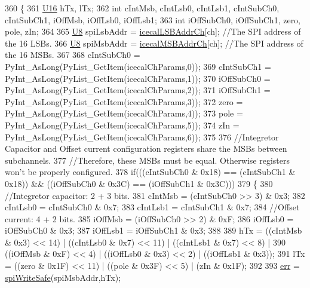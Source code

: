 \begin{DoxyCode}
360 \{                            
361     \hyperlink{ICECALv3_8h_adf928e51a60dba0df29d615401cc55a8}{U16} hTx, lTx;
362     \textcolor{keywordtype}{int} cIntMsb, cIntLsb0, cIntLsb1, cIntSubCh0, cIntSubCh1, iOffMsb, iOffLsb0, iOffLsb1;
363     \textcolor{keywordtype}{int} iOffSubCh0, iOffSubCh1, zero, pole, zIn;
364 
365     \hyperlink{ICECALv3_8h_a3cb25ca6f51f003950f9625ff05536fc}{U8} spiLsbAddr = \hyperlink{ICECALv3_8h_abd124f50fa794b9b0aded801fabf5322}{icecalLSBAddrCh}[ch];           \textcolor{comment}{//The SPI address of the 16 LSBs.}
366     \hyperlink{ICECALv3_8h_a3cb25ca6f51f003950f9625ff05536fc}{U8} spiMsbAddr = \hyperlink{ICECALv3_8h_afba64a649cc9314882fd49b62b99d6e7}{icecalMSBAddrCh}[ch];           \textcolor{comment}{//The SPI address of the 16 MSBs.}
367 
368     cIntSubCh0 = PyInt\_AsLong(PyList\_GetItem(icecalChParams,0));
369     cIntSubCh1 = PyInt\_AsLong(PyList\_GetItem(icecalChParams,1));
370     iOffSubCh0 = PyInt\_AsLong(PyList\_GetItem(icecalChParams,2));
371     iOffSubCh1 = PyInt\_AsLong(PyList\_GetItem(icecalChParams,3));
372     zero             = PyInt\_AsLong(PyList\_GetItem(icecalChParams,4));
373     pole             = PyInt\_AsLong(PyList\_GetItem(icecalChParams,5));
374     zIn              = PyInt\_AsLong(PyList\_GetItem(icecalChParams,6));
375 
376     \textcolor{comment}{//Integretor Capacitor and Offset current configuration registers share the MSBs between subchannels.}
377     \textcolor{comment}{//Therefore, these MSBs must be equal. Otherwise registers won't be properly configured. }
378     \textcolor{keywordflow}{if}(((cIntSubCh0 & 0x18) == (cIntSubCh1 & 0x18)) && ((iOffSubCh0 & 0x3C) == (iOffSubCh1 & 0x3C)))
379     \{
380         \textcolor{comment}{//Integretor capacitor: 2 + 3 bits.}
381         cIntMsb  = (cIntSubCh0 >> 3) & 0x3;
382         cIntLsb0 =  cIntSubCh0 & 0x7;
383         cIntLsb1 =  cIntSubCh1 & 0x7;
384         \textcolor{comment}{//Offset current: 4 + 2 bits.}
385         iOffMsb  = (iOffSubCh0 >> 2) & 0xF;
386         iOffLsb0 =  iOffSubCh0 & 0x3;
387         iOffLsb1 =  iOffSubCh1 & 0x3;
388 
389         hTx =  ((cIntMsb & 0x3) << 14) | ((cIntLsb0 & 0x7) << 11) | ((cIntLsb1 & 0x7) << 8) | 
390                      ((iOffMsb & 0xF) << 4)  | ((iOffLsb0 & 0x3) << 2)  | ((iOffLsb1 & 0x3));
391         lTx =    ((zero & 0x1F) << 11)   | ((pole & 0x3F) << 5)     | (zIn & 0x1F);
392 
393                             \hyperlink{classICECALv3_ad8989925ee5b3ff322d863ce6aaff0bd}{err} = \hyperlink{classICECALv3_aa0b8358ea0be8e47a8aded5e1551787f}{spiWriteSafe}(spiMsbAddr,hTx);  

\end{DoxyCode}
